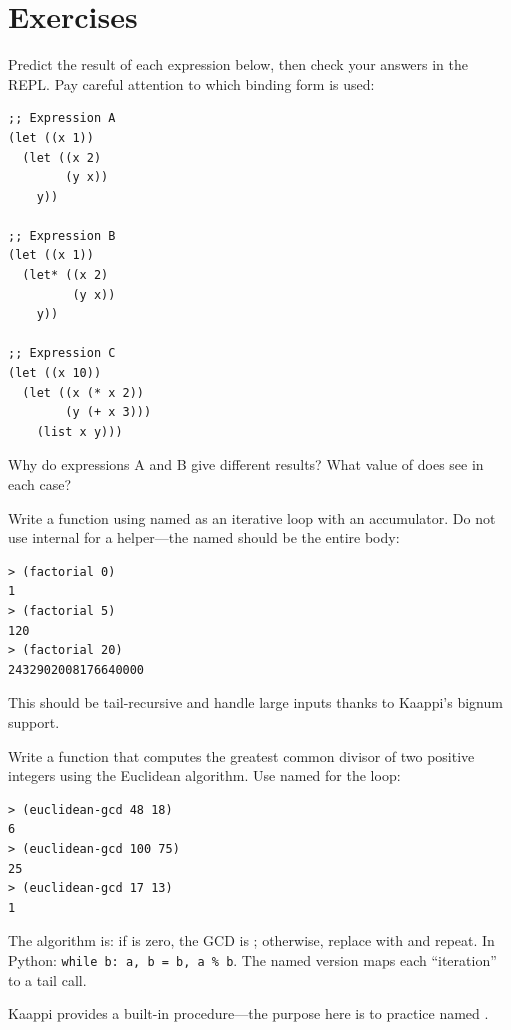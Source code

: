 \section*{Exercises}

\begin{exercise}
Predict the result of each expression below, then check your answers in the REPL. Pay careful attention to which binding form is used:

\begin{lstlisting}
;; Expression A
(let ((x 1))
  (let ((x 2)
        (y x))
    y))

;; Expression B
(let ((x 1))
  (let* ((x 2)
         (y x))
    y))

;; Expression C
(let ((x 10))
  (let ((x (* x 2))
        (y (+ x 3)))
    (list x y)))
\end{lstlisting}

Why do expressions A and B give different results? What value of  does  see in each case?
\end{exercise}

\begin{exercise}
Write a function  using named  as an iterative loop with an accumulator. Do not use internal  for a helper---the named  should be the entire body:

\begin{lstlisting}[style=repl]
> (factorial 0)
1
> (factorial 5)
120
> (factorial 20)
2432902008176640000
\end{lstlisting}

This should be tail-recursive and handle large inputs thanks to Kaappi's bignum support.
\end{exercise}

\begin{exercise}
Write a function  that computes the greatest common divisor of two positive integers using the Euclidean algorithm. Use named  for the loop:

\begin{lstlisting}[style=repl]
> (euclidean-gcd 48 18)
6
> (euclidean-gcd 100 75)
25
> (euclidean-gcd 17 13)
1
\end{lstlisting}

The algorithm is: if  is zero, the GCD is ; otherwise, replace  with  and repeat. In Python: \texttt{while b: a, b = b, a \% b}. The named  version maps each ``iteration'' to a tail call.

Kaappi provides a built-in  procedure---the purpose here is to practice named .
\end{exercise}

